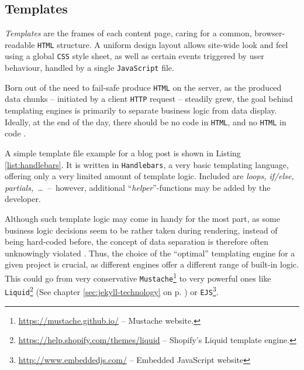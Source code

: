 \subsection{Templates}
\label{sec:buildpipelines-templates}

\emph{Templates} are the frames of each content page, caring for a common, browser-readable \texttt{HTML} structure. A uniform design layout allows site-wide look and feel using a global \texttt{CSS} style sheet, as well as certain events triggered by user behaviour, handled by a single \texttt{JavaScript} file.

Born out of the need to fail-safe produce \texttt{HTML} on the server, as the produced data chunks -- initiated by a client \texttt{HTTP} request -- steadily grew, the goal behind templating engines is primarily to separate business logic from data display. Ideally, at the end of the day, there should be no code in \texttt{HTML}, and no \texttt{HTML} in code \cite[225]{Parr2004templates}.



A simple template file example for a blog post is shown in Listing \ref{list:handlebars}. It is written in \texttt{Handlebars}, a very basic templating language, offering only a very limited amount of template logic. Included are \emph{loops, if/else, partials,~\ldots}~--~however, additional ``\emph{helper}''-functions may be added by the developer.

Although such template logic may come in handy for the most part, as some business logic decisions seem to be rather taken during rendering, instead of being hard-coded before, the concept of data separation is therefore often unknowingly violated \cite[228]{Parr2004templates}. Thus, the choice of the ``optimal'' templating engine for a given project is crucial, as different engines offer a different range of built-in logic. This could go from very conservative \texttt{Mustache}\footnote{\url{https://mustache.github.io/} -- Mustache website.} to very powerful ones like \texttt{Liquid}\footnote{\url{https://help.shopify.com/themes/liquid} -- Shopify's Liquid template engine.} (See chapter \ref{sec:jekyll-technology} on p. \pageref{sec:jekyll-technology}) or \texttt{EJS}\footnote{\url{http://www.embeddedjs.com/} -- Embedded JavaScript website}.
